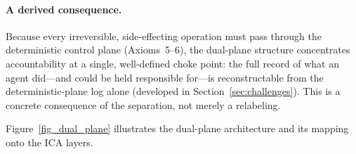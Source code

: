 \paragraph{A derived consequence.}
Because every irreversible, side-effecting operation must pass through the deterministic control plane (Axioms~5--6), the dual-plane structure concentrates accountability at a single, well-defined choke point: the full record of what an agent did---and could be held responsible for---is reconstructable from the deterministic-plane log alone (developed in Section~\ref{sec:challenges}). This is a concrete consequence of the separation, not merely a relabeling.

Figure~\ref{fig_dual_plane} illustrates the dual-plane architecture and its mapping onto the ICA layers.

